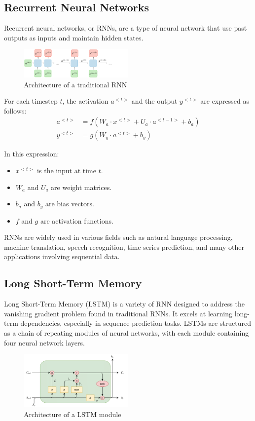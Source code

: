 \documentclass[conference]{IEEEtran}
\begin{document}
\subsection{Recurrent Neural Networks}
Recurrent neural networks, or RNNs, are a type of neural network that use past outputs as inputs and maintain hidden states.
\begin{figure}[htbp]
    \centering
    \includegraphics[width=0.5\textwidth]{Figure/architecture-rnn-ltr.png} %
    \caption{Architecture of a traditional RNN}
    \label{fig:example}
\end{figure}

For each timestep \( t \), the activation \( a^{<t>} \) and the output \( y^{<t>} \) are expressed as follows:
\begin{align*}
a^{<t>} &= f(W_{a} \cdot x^{<t>} + U_{a} \cdot a^{<t-1>} + b_{a}) \\
y^{<t>} &= g(W_{y} \cdot a^{<t>} + b_{y})
\end{align*}

In this expression: 
\begin{itemize}
    \item \( x^{<t>} \) is the input at time \( t \).
    \item \( W_{a} \) and \( U_{a} \) are weight matrices.
    \item \( b_{a} \) and \( b_{y} \) are bias vectors.
    \item \( f \) and \( g \) are activation functions.
\end{itemize}
RNNs are widely used in various fields such as natural language processing, machine translation, speech recognition, time series prediction, and many other applications involving sequential data.

\subsection{Long Short-Term Memory}
Long Short-Term Memory (LSTM) is a variety of RNN designed to address the vanishing gradient problem found in traditional RNNs. It excels at learning long-term dependencies, especially in sequence prediction tasks.
LSTMs are structured as a chain of repeating modules of neural networks, with each module containing four neural network layers. 
\begin{figure}[htbp]
    \centering
    \includegraphics[width=0.5\textwidth]{Figure/lstm.png} %
    \caption{Architecture of a LSTM module}
    \label{fig:example}
\end{figure}
\end{document}
